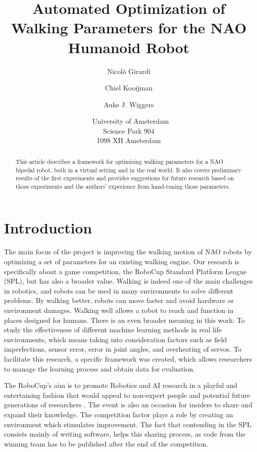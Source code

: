 \documentclass{article}
\title{\huge Automated Optimization of Walking Parameters for the NAO Humanoid Robot}
\author{Nicol\`o Girardi \affila \and
	Chiel Kooijman \affila \and
	Auke J. Wiggers \affila}
\date{\affila\ University of Amsterdam\\Science Park 904\\1098 XH Amsterdam}
\begin{document}
\ttl
\thispagestyle{empty}

\begin{abstract}
	\noindent
	This article describes a framework for optimising walking parameters for a
	NAO bipedal robot, both in a virtual setting and in the real world. It also
	covers preliminary results of the first experiments and provides
	suggestions for future research based on those experiments and the authors'
	experience from hand-tuning those parameters.
\end{abstract}

\section{Introduction}
The main focus of the project is improving the walking motion of NAO robots by
optimizing a set of parameters for an existing walking engine. Our research is
specifically about a game competition, the RoboCup Standard Platform League
(SPL), but has also a broader value. Walking is indeed one of the main
challenges in robotics, and robots can be used in many environments to solve
different problems. By walking better, robots can move faster and avoid hardware
or environment damages. Walking well allows a robot to reach and function in
places designed for humans. There is an even broader meaning in this work:
To study the effectiveness of different machine learning methods in real
life environments, which means taking into consideration factors such as field
imperfections, sensor error, error in joint angles, and overheating of servos.
To facilitate this research, a specific framework was created, which allows
researchers to manage the learning process and obtain data for evaluation. 

The RoboCup's aim is to promote Robotics and AI research in a playful and
entertaining fashion that would appeal to non-expert people and potential
future generations of researchers \cite{kitano1997robocup}. The event is also
an occasion for insiders to share and expand their knowledge. The competition
factor plays a role by creating an environment which stimulates improvement.
The fact that contending in the SPL consists mainly of writing software, helps
this sharing process, as code from the winning team has to be published after
the end of the competition. 
\end{document}
